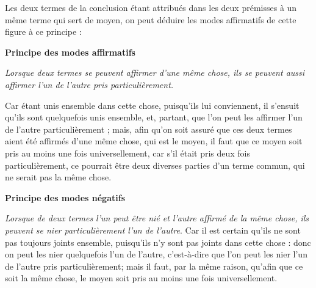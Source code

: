 Les deux termes de la conclusion étant attribués dans les deux prémisses à un même terme qui sert de moyen, on peut déduire les modes affirmatifs de cette figure à ce principe :

\begin{center}{\bfseries Principe des modes affirmatifs}\end{center}

\emph{Lorsque deux termes se peuvent affirmer d'une même chose, ils se peuvent aussi affirmer l'un de l'autre pris particulièrement.}

Car étant unis ensemble dans cette chose, puisqu'ils lui conviennent, il s'ensuit qu'ils sont quelquefois unis ensemble, et, partant, que l'on peut les affirmer l'un de l'autre particulièrement ; mais, afin qu'on soit assuré que ces deux termes aient été affirmés d'une même chose, qui est le moyen, il faut que ce moyen soit pris au moins une fois universellement, car s'il était pris deux fois particulièrement, ce pourrait être deux diverses parties d'un terme commun, qui ne serait pas la même chose.

\begin{center}{\bfseries Principe des modes négatifs}\end{center}

\emph{Lorsque de deux termes l'un peut être nié et l'autre affirmé de la même chose, ils peuvent se nier particulièrement l'un de l'autre}. Car il est certain qu'ils ne sont pas toujours joints ensemble, puisqu'ils n'y sont pas joints dans cette chose : donc on peut les nier quelquefois l'un de l'autre, c'est-à-dire que l'on peut les nier l'un de l'autre pris particulièrement; mais il faut, par la même raison, qu'afin que ce soit la même chose, le moyen soit pris au moins une fois universellement.

